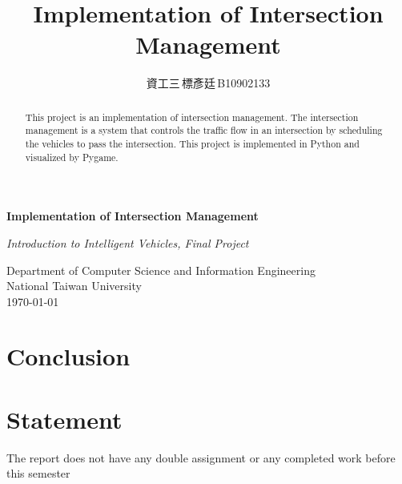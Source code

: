 \documentclass{article}
\title{Implementation of Intersection Management}
\author{資工三\,標彥廷\,B10902133}
\begin{document}
\begin{titlepage}
    \centering
    \vspace*{1cm}
    
    \Huge
    \textbf{Implementation of Intersection Management}
    
    \vspace{0.5cm}
    \LARGE
    \textit{Introduction to Intelligent Vehicles, Final Project}
    
    \vspace{1.5cm}
    
    
    \vfill
    
    \Large
    Department of Computer Science and Information Engineering\\
    National Taiwan University\\
    \today
    
\end{titlepage}

\begin{abstract}
    This project is an implementation of intersection management. The intersection management is a system that controls the traffic flow in an intersection by scheduling the vehicles to pass the intersection. This project is implemented in Python and visualized by Pygame.
    
\end{abstract}



 
\section{Conclusion}

\section{Statement}
The report does not have any double assignment or any completed work before this semester
\end{document}
